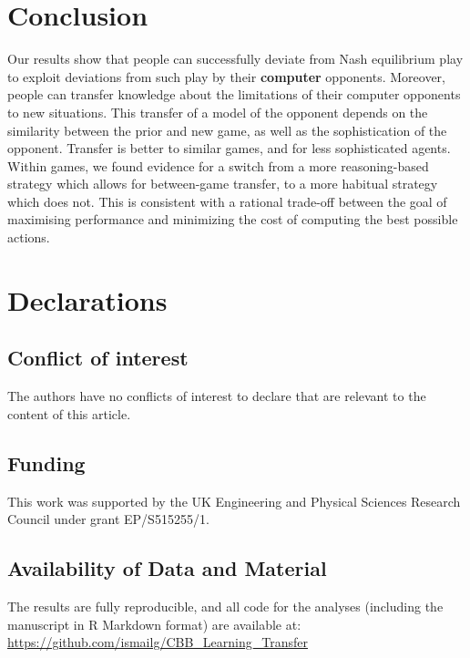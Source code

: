 \documentclass[smallextended]{svjour3}       %
\begin{document}
\hypertarget{conclusion}{%
\section{Conclusion}\label{conclusion}}

Our results show that people can successfully deviate from Nash
equilibrium play to exploit deviations from such play by their
\textbf{computer} opponents. Moreover, people can transfer knowledge
about the limitations of their computer opponents to new situations.
This transfer of a model of the opponent depends on the similarity
between the prior and new game, as well as the sophistication of the
opponent. Transfer is better to similar games, and for less
sophisticated agents. Within games, we found evidence for a switch from
a more reasoning-based strategy which allows for between-game transfer,
to a more habitual strategy which does not. This is consistent with a
rational trade-off between the goal of maximising performance and
minimizing the cost of computing the best possible actions.

\hypertarget{declarations}{%
\section{Declarations}\label{declarations}}

\hypertarget{conflict-of-interest}{%
\subsection{Conflict of interest}\label{conflict-of-interest}}

The authors have no conflicts of interest to declare that are relevant
to the content of this article.

\hypertarget{funding}{%
\subsection{Funding}\label{funding}}

This work was supported by the UK Engineering and Physical Sciences
Research Council under grant EP/S515255/1.

\hypertarget{availability-of-data-and-material}{%
\subsection{Availability of Data and
Material}\label{availability-of-data-and-material}}

The results are fully reproducible, and all code for the analyses
(including the manuscript in R Markdown format) are available at:
\url{https://github.com/ismailg/CBB_Learning_Transfer}
\end{document}
